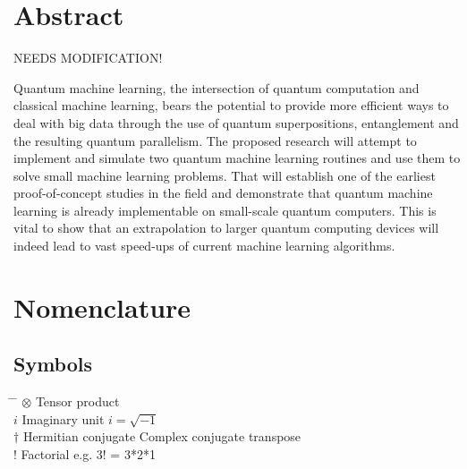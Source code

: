  \cleardoublepage


 \setcounter{tocdepth}{2}
 \tableofcontents

 \cleardoublepage


\chapter*{Abstract}

NEEDS MODIFICATION!

Quantum machine learning, the intersection of quantum computation and classical machine learning,
bears the potential to provide more efficient ways to deal with big data through the use of quantum
superpositions, entanglement and the resulting quantum parallelism. The proposed research will
attempt to implement and simulate two quantum machine learning routines and use them to solve
small machine learning problems. That will establish one of the earliest proof-of-concept studies in
the field and demonstrate that quantum machine learning is already implementable on small-scale
quantum computers. This is vital to show that an extrapolation to larger quantum computing devices
will indeed lead to vast speed-ups of current machine learning algorithms.

 \cleardoublepage


\chapter*{Nomenclature}\label{chap:symbole}

\section*{Symbols}
\begin{tabbing}
 \hspace*{1.6cm} \= \hspace*{8cm} \= \kill
 $\otimes$ \> Tensor product \\[0.5ex]
 $i$ \> Imaginary unit \> $i=\sqrt{-1}$ \\[0.5ex]
 $\dagger$ \> Hermitian conjugate \> Complex conjugate transpose \\[0.5ex]
 $!$ \> Factorial \> e.g. 3! = 3*2*1 \\[0.5ex]
\end{tabbing}

